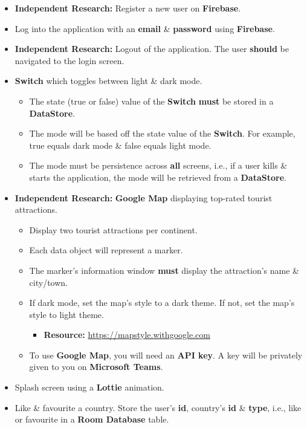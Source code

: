 \documentclass{article}
\begin{document}
\begin{itemize}
	\item \textbf{Independent Research:} Register a new user on \textbf{Firebase}.
	\item Log into the application with an \textbf{email} \& \textbf{password} using \textbf{Firebase}.
	\item \textbf{Independent Research:} Logout of the application. The user \textbf{should} be navigated to the login screen.
	\item \textbf{Switch} which toggles between light \& dark mode.
	      \begin{itemize}
		      \item The state (true or false) value of the \textbf{Switch} \textbf{must} be stored in a \textbf{DataStore}.
		      \item The mode will be based off the state value of the \textbf{Switch}. For example, true equals dark mode \& false equals light mode.
		      \item The mode must be persistence across \textbf{all} screens, i.e., if a user kills \& starts the application, the mode will be retrieved from a \textbf{DataStore}.
	      \end{itemize}
	\item \textbf{Independent Research:} \textbf{Google Map} displaying top-rated tourist attractions.
	      \begin{itemize}
		      \item Display two tourist attractions per continent.
		      \item Each data object will represent a marker.
		      \item The marker's information window \textbf{must} display the attraction's name \& city/town.
		      \item If dark mode, set the map's style to a dark theme. If not, set the map's style to light theme.
		            \begin{itemize}
			            \item \textbf{Resource:} \small\href{https://mapstyle.withgoogle.com}{https://mapstyle.withgoogle.com}
		            \end{itemize}
		      \item To use \textbf{Google Map}, you will need an \textbf{API key}. A key will be privately given to you on \textbf{Microsoft Teams}.
	      \end{itemize}
	\item Splash screen using a \textbf{Lottie} animation.
	\item Like \& favourite a country. Store the user's \textbf{id}, country's \textbf{id} \& \textbf{type}, i.e., like or favourite in a \textbf{Room Database} table.  

\end{itemize}
\end{document}
